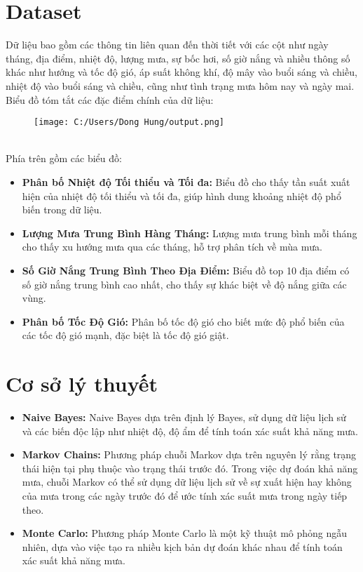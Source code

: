 \documentclass[conference]{IEEEtran}
\begin{document}
\section {Dataset} 
Dữ liệu bao gồm các thông tin liên quan đến thời tiết với các cột như ngày tháng, địa điểm, nhiệt độ, lượng mưa, sự bốc hơi, số giờ nắng và nhiều thông số khác như hướng và tốc độ gió, áp suất không khí, độ mây vào buổi sáng và chiều, nhiệt độ vào buổi sáng và chiều, cũng như tình trạng mưa hôm nay và ngày mai.
\\
\indent Biểu đồ tóm tắt các đặc điểm chính của dữ liệu:
\begin{figure}[ht]
    \centering
    \texttt{[image: C:/Users/Dong Hung/output.png]}
    \label{fig:my_label}
\end{figure}
\\
Phía trên gồm các biểu đồ:
\begin{itemize}
\item \textbf{Phân bố Nhiệt độ Tối thiểu và Tối đa:} Biểu đồ cho thấy tần suất xuất hiện của nhiệt độ tối thiểu và tối đa, giúp hình dung khoảng nhiệt độ phổ biến trong dữ liệu.
\item \textbf{Lượng Mưa Trung Bình Hàng Tháng:} Lượng mưa trung bình mỗi tháng cho thấy xu hướng mưa qua các tháng, hỗ trợ phân tích về mùa mưa.
\item \textbf{Số Giờ Nắng Trung Bình Theo Địa Điểm:} Biểu đồ top 10 địa điểm có số giờ nắng trung bình cao nhất, cho thấy sự khác biệt về độ nắng giữa các vùng.
\item \textbf{Phân bố Tốc Độ Gió:} Phân bố tốc độ gió cho biết mức độ phổ biến của các tốc độ gió mạnh, đặc biệt là tốc độ gió giật.
\end{itemize}

\section{Cơ sở lý thuyết}
\begin{itemize}
    \item \textbf{Naive Bayes:} Naive Bayes dựa trên định lý Bayes, sử dụng dữ liệu lịch sử và các biến độc lập như nhiệt độ, độ ẩm để tính toán xác suất khả năng mưa.
    \item \textbf{Markov Chains:} Phương pháp chuỗi Markov dựa trên nguyên lý rằng trạng thái hiện tại phụ thuộc vào trạng thái trước đó. Trong việc dự đoán khả năng mưa, chuỗi Markov có thể sử dụng dữ liệu lịch sử về sự xuất hiện hay không của mưa trong các ngày trước đó để ước tính xác suất mưa trong ngày tiếp theo.
    \item \textbf{Monte Carlo:} Phương pháp Monte Carlo là một kỹ thuật mô phỏng ngẫu nhiên, dựa vào việc tạo ra nhiều kịch bản dự đoán khác nhau để tính toán xác suất khả năng mưa.
\end{itemize}
\end{document}
